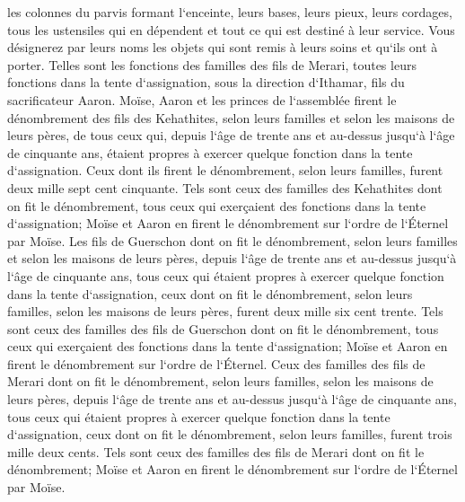 \verse les colonnes du parvis formant l`enceinte, leurs bases, leurs pieux, leurs cordages, tous les ustensiles qui en dépendent et tout ce qui est destiné à leur service. Vous désignerez par leurs noms les objets qui sont remis à leurs soins et qu`ils ont à porter. 
\verse Telles sont les fonctions des familles des fils de Merari, toutes leurs fonctions dans la tente d`assignation, sous la direction d`Ithamar, fils du sacrificateur Aaron. 
\verse Moïse, Aaron et les princes de l`assemblée firent le dénombrement des fils des Kehathites, selon leurs familles et selon les maisons de leurs pères, 
\verse de tous ceux qui, depuis l`âge de trente ans et au-dessus jusqu`à l`âge de cinquante ans, étaient propres à exercer quelque fonction dans la tente d`assignation. 
\verse Ceux dont ils firent le dénombrement, selon leurs familles, furent deux mille sept cent cinquante. 
\verse Tels sont ceux des familles des Kehathites dont on fit le dénombrement, tous ceux qui exerçaient des fonctions dans la tente d`assignation; Moïse et Aaron en firent le dénombrement sur l`ordre de l`Éternel par Moïse. 
\verse Les fils de Guerschon dont on fit le dénombrement, selon leurs familles et selon les maisons de leurs pères, 
\verse depuis l`âge de trente ans et au-dessus jusqu`à l`âge de cinquante ans, tous ceux qui étaient propres à exercer quelque fonction dans la tente d`assignation, 
\verse ceux dont on fit le dénombrement, selon leurs familles, selon les maisons de leurs pères, furent deux mille six cent trente. 
\verse Tels sont ceux des familles des fils de Guerschon dont on fit le dénombrement, tous ceux qui exerçaient des fonctions dans la tente d`assignation; Moïse et Aaron en firent le dénombrement sur l`ordre de l`Éternel. 
\verse Ceux des familles des fils de Merari dont on fit le dénombrement, selon leurs familles, selon les maisons de leurs pères, 
\verse depuis l`âge de trente ans et au-dessus jusqu`à l`âge de cinquante ans, tous ceux qui étaient propres à exercer quelque fonction dans la tente d`assignation, 
\verse ceux dont on fit le dénombrement, selon leurs familles, furent trois mille deux cents. 
\verse Tels sont ceux des familles des fils de Merari dont on fit le dénombrement; Moïse et Aaron en firent le dénombrement sur l`ordre de l`Éternel par Moïse. 
